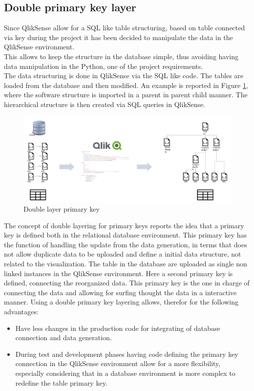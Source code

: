 \documentclass[../main.tex]{subfiles}
\begin{document}
\subsection{Double primary key layer}
Since QlikSense allow for a SQL like table structuring, based on table connected via key during the project it has been decided to manipulate the data in the QlikSense environment.\\
This allows to keep the structure in the database simple, thus avoiding having data manipulation in the Python, one of the project requirements.\\
The data structuring is done in QlikSense via the SQL like code. The tables are loaded from the database and then modified. An example is reported in Figure \ref{fig:doublelayer}, where the software structure is imported in a parent in parent child manner. The hierarchical structure is then created via SQL queries in QlikSense.  
\begin{figure}[H]
    \centering
    \includegraphics[width=\linewidth]{images_folder/doublalayer.png}
    \caption{Double layer primary key}
    \label{fig:doublelayer}
\end{figure} 
The concept of double layering for primary keys reports the idea that a primary key is defined both in the relational database environment. This primary key has the function of handling the update from the data generation, in terms that does not allow duplicate data to be uploaded and define a initial data structure, not related to the visualization. The table in the database are uploaded as single non linked instances in the QlikSense environment. Here a second primary key is defined, connecting the reorganized data. This primary key is the one in charge of connecting the data and allowing for surfing thought the data in a interactive manner. 
Using a double primary key layering allows, therefor for the following advantages:
\begin{itemize}
\item Have less changes in the production code for integrating of database connection and data generation.
\item During test and development phases having code defining the primary key connection in the QlikSense environment allow for a more flexibility, especially considering that in a database environment is more complex to redefine the table primary key. 
\end{itemize}
\end{document}
